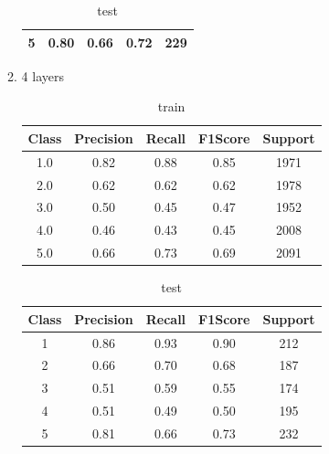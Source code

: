\begin{enumerate}[label=(\alph*)]
\begin{enumerate}[label=\roman*.]
\begin{table}[!htb]
\begin{tabular}{ccccc}
                            5     & 0.80      & 0.66   & 0.72    & 229     \\ \hline
                        \end{tabular}
                        \caption{test}
                        \label{part f test depth 3}
                    \end{table}
              \item 4 layers
                    \begin{table}[!htb]
                        \centering
                        \begin{tabular}{ccccc}
                            \hline
                            Class & Precision & Recall & F1Score & Support \\ \hline
                            1.0   & 0.82      & 0.88   & 0.85    & 1971    \\
                            2.0   & 0.62      & 0.62   & 0.62    & 1978    \\
                            3.0   & 0.50      & 0.45   & 0.47    & 1952    \\
                            4.0   & 0.46      & 0.43   & 0.45    & 2008    \\
                            5.0   & 0.66      & 0.73   & 0.69    & 2091    \\ \hline
                        \end{tabular}
                        \caption{train}
                        \label{part f train depth 4}
                    \end{table}
                    \begin{table}[!htb]
                        \centering
                        \begin{tabular}{ccccc}
                            \hline
                            Class & Precision & Recall & F1Score & Support \\ \hline
                            1     & 0.86      & 0.93   & 0.90    & 212     \\
                            2     & 0.66      & 0.70   & 0.68    & 187     \\
                            3     & 0.51      & 0.59   & 0.55    & 174     \\
                            4     & 0.51      & 0.49   & 0.50    & 195     \\
                            5     & 0.81      & 0.66   & 0.73    & 232     \\ \hline
                        \end{tabular}
                        \caption{test}
                        \label{part f test depth 4}
                    \end{table}
                    \newpage



\end{enumerate}
\end{enumerate}
